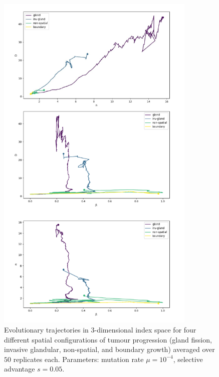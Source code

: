 \begin{figure}[h!]
    \centering
    \includegraphics[width=0.85\textwidth]{Chapter_3/figures/1e04005.pdf}
    \caption{Evolutionary trajectories in $3$-dimensional index space for four
    different spatial configurations of tumour progression (gland fission,
    invasive glandular, non-spatial, and boundary growth) averaged over $50$
    replicates each. Parameters: mutation rate $\mu = 10^{-4}$, selective
    advantage $s = 0.05$.}
    \label{fig:1e04_005}
\end{figure}
\clearpage

